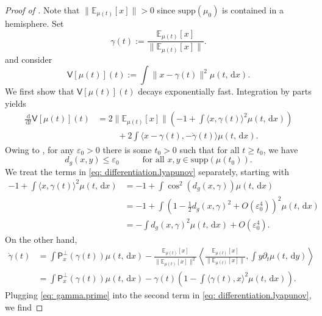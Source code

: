 \documentclass[a4paper,11pt]{article}
\theoremstyle{plain}
\newcommand{\supp}{\mathrm{supp}}
\newcommand{\proj}{\bm{\mathsf{P}}^\perp}
\newcommand{\diff}{\, \mathrm{d}}
\renewcommand{\leq}{\leqslant}
\renewcommand{\geq}{\geqslant}
\numberwithin{equation}{section}
\begin{document}
\begin{proof}[Proof of ]
Note that $\|\mathbb{E}_{\mu(t)}[x]\|>0$ since $\supp(\mu_0)$ is contained in a hemisphere.
Set 
$$
\gamma(t):=\frac{\mathbb{E}_{\mu(t)}[x]}{\|\mathbb{E}_{\mu(t)}[x]\|}.
$$ 
and consider
\begin{equation*} 
    \mathsf{V}[\mu(t)](t):=\int\|x-\gamma(t)\|^2\mu(t,\diff x).
\end{equation*}
We first show that $\mathsf{V}[\mu(t)](t)$ decays exponentially fast.
Integration by parts yields
 \begin{align}
     \frac{\diff}{\diff t} \mathsf{V}[\mu(t)](t)&=2\|\mathbb{E}_{\mu(t)}[x]\|\left(-1+\int \langle x, \gamma(t)\rangle^2\mu(t,\diff x)\right)\nonumber\\
     &\hspace{1cm}+2\int \langle x-\gamma(t),-\dot{\gamma}(t)\rangle \mu(t,\diff x).\label{eq: differentiation.lyapunov}
 \end{align}
 Owing to , for any $\varepsilon_0>0$ there is some $t_0>0$ such that for all $t\geq t_0$, we have 
 \begin{equation}\label{eq: smallness}
     d_g(x,y)\leq \varepsilon_0 \hspace{1cm} \text{ for all }x,y\in \supp(\mu(t_0)).
 \end{equation} 
 We treat the terms in \eqref{eq: differentiation.lyapunov} separately, starting with
 \begin{align}
     -1+\int \langle x, \gamma(t)\rangle^2\mu(t,\diff x)&=-1+\int \cos^2\left(d_g(x,\gamma)\right)\mu(t,\diff x)\nonumber\\
     &=-1+\int\left(1-\frac{1}{2}d_g(x,\gamma)^2+O\left(\varepsilon_0^4\right)\right)^2\mu(t,\diff x)\nonumber\\
     &=-\int d_g(x,\gamma)^2\mu(t,\diff x)+O\left(\varepsilon_0^4\right).
     \label{eq: expectation.term}
 \end{align}
On the other hand,
 \begin{align}
     \dot{\gamma}(t)&=\int \proj_x(\gamma(t)) \mu(t,\diff x)-\frac{\mathbb{E}_{\mu(t)}[x]}{\|\mathbb{E}_{\mu(t)}[x]\|^2}\left\langle \frac{\mathbb{E}_{\mu(t)}[x]}{\|\mathbb{E}_{\mu(t)}[x]\|},\int y\partial_t\mu(t,\diff y)\right\rangle\nonumber\\
     &=\int \proj_x(\gamma(t)) \mu(t,\diff x)-\gamma(t)\left(1-\int \langle \gamma(t),x\rangle^2\mu(t,\diff x)\right).
     \label{eq: gamma.prime}
 \end{align}
 Plugging \eqref{eq: gamma.prime} into the second term in \eqref{eq: differentiation.lyapunov}, we find

\end{proof}
\end{document}
